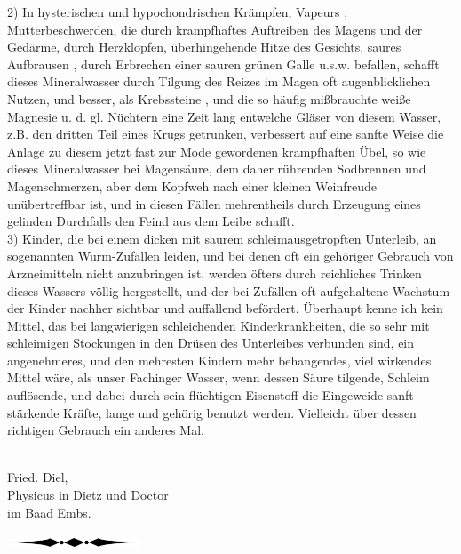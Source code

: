 \documentclass[11pt,a5paper,twoside]{memoir}
\begin{document}
2) In hysterischen und hypochondrischen Krämpfen, Vapeurs%
,
Mutterbeschwerden,
die durch krampfhaftes Auftreiben des Magens und der Gedärme,
durch Herzklopfen, überhingehende Hitze des Gesichts,
saures Aufbrausen%
,
durch Erbrechen einer sauren grünen Galle u.s.w. befallen,
schafft dieses Mineralwasser
durch Tilgung des Reizes im Magen oft  augenblicklichen Nutzen,
und besser, als Krebssteine%
,
und die so häufig mißbrauchte weiße Magnesie%
u. d. gl. Nüchtern eine Zeit lang entwelche Gläser von diesem Wasser,
z.B. den dritten Teil eines Krugs getrunken,
verbessert auf eine sanfte Weise die Anlage
zu diesem jetzt fast zur Mode gewordenen krampfhaften Übel,
so wie dieses Mineralwasser bei Magensäure,
dem daher rührenden Sodbrennen und Magenschmerzen,
aber dem Kopfweh nach einer kleinen Weinfreude unübertreffbar ist,
und in diesen Fällen mehrentheils
durch Erzeugung eines gelinden Durchfalls
den Feind aus dem Leibe schafft.\\

3) Kinder, die bei einem dicken mit saurem schleimausgetropften Unterleib,
an sogenannten Wurm-Zufällen leiden,
und bei denen oft ein gehöriger Gebrauch
von  Arzneimitteln nicht anzubringen ist,
werden öfters durch reichliches Trinken dieses Wassers völlig hergestellt,
und der bei Zufällen oft aufgehaltene Wachstum der Kinder
nachher sichtbar und auffallend befördert.
Überhaupt kenne ich kein Mittel,
das bei langwierigen schleichenden Kinderkrankheiten,
die so sehr mit schleimigen Stockungen
in den Drüsen des Unterleibes verbunden sind,
ein angenehmeres, und den mehresten Kindern mehr behangendes,
viel wirkendes Mittel wäre,
als unser Fachinger Wasser,
wenn dessen Säure tilgende, Schleim auflösende,
und dabei durch sein flüchtigen Eisenstoff
die Eingeweide sanft stärkende Kräfte,
lange und gehörig benutzt werden.
Vielleicht über dessen richtigen Gebrauch ein anderes Mal.\\
\\

\hfill
\begin{minipage}{6cm}
  \centering
{\Large Fried. Diel,}\\
Physicus in Dietz und Doctor\\
im Baad Embs.
\end{minipage}

\vfill
\begin{center}
\includegraphics[width=4cm]{figures/div2}
\end{center}
\vfill%
%
\checkoddpage\ifoddpage
  \newpage\strut
  \fancyhead[C]{}\fi
\end{document}
